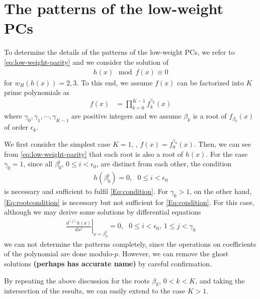 \section{The patterns of the low-weight PCs}
\label{sec3}
To determine the details of the patterns of the low-weight PCs, we refer to \eqref{eq:low-weight-parity} and we consider the solution of
\begin{align}
	h(x) \mod f(x) \equiv 0
	\label{Eq:condition}
\end{align}
for $w_H(h(x))=2,3$. To this end, we assume $f(x)$ can be factorized into $K$ prime polynomials as 
\begin{align}
f(x)&=\prod_{k=0}^{K-1}f_k^{\gamma_k}(x)
\end{align}
where $\gamma_0,\gamma_1,\cdots,\gamma_{K-1}$ are positive integers and we assume $\beta_k$ is a root of $f_{\beta_k}(x)$ of order $\epsilon_k$.


We first consider the simplest case $K=1$, \ie, $f(x) = f_0^{\gamma_0}(x)$. Then, we can see from \eqref{eq:low-weight-parity} that each root is also a root of $h(x)$. For the case $\gamma_0 = 1$, since all $\beta_0^i$, $0 \leq i < \epsilon_0$, are distinct from each other, the condition
\begin{align}
	h(\beta_0^i)=0,~~~ 0 \leq i < \epsilon_0
	\label{Eq:rootcondition}
\end{align}
is necessary and sufficient to fulfil \eqref{Eq:condition}. For $\gamma_0 > 1$, on the other hand, \eqref{Eq:rootcondition} is necessary but not sufficient for \eqref{Eq:condition}. For this case, although we may derive some solutions by differential equations
\begin{align}
\left.\frac{d^{(j)}h(x)}{d x^j}\right|_{x=\beta_0^i}=0,~~~0 \leq i < \epsilon_0,~1 \leq j < \gamma_0
\label{Eq:differential}
\end{align}
we can not determine the patterns completely, since the operations on coefficients of the polynomial are done modulo-$p$. However, we can remove the ghost solutions {\bf (perhaps has accurate name)} by careful confirmation.

By repeating the above discussion for the roots $\beta_k$, $0 < k < K$, and taking the intersection of the results, we can easily extend to the case $K>1$.
%
